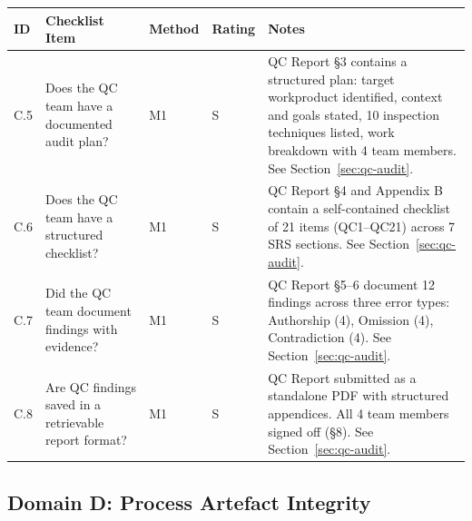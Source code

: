 \documentclass[11pt,a4paper]{article}
\begin{document}
\begin{longtable}{|L{0.8cm}|L{4cm}|L{1.3cm}|L{1.3cm}|L{5.5cm}|}
\hline
{}
\textbf{ID} & \textbf{Checklist Item} & \textbf{Method} & \textbf{Rating} & \textbf{Notes} \\
\hline
\endhead
C.5 & Does the QC team have a documented audit plan? & M1 & S & QC Report \S3 contains a structured plan: target workproduct identified, context and goals stated, 10 inspection techniques listed, work breakdown with 4 team members. See Section~\ref{sec:qc-audit}. \\\hline
C.6 & Does the QC team have a structured checklist? & M1 & S & QC Report \S4 and Appendix B contain a self-contained checklist of 21 items (QC1--QC21) across 7 SRS sections. See Section~\ref{sec:qc-audit}. \\\hline
C.7 & Did the QC team document findings with evidence? & M1 & S & QC Report \S5--6 document 12 findings across three error types: Authorship (4), Omission (4), Contradiction (4). See Section~\ref{sec:qc-audit}. \\\hline
C.8 & Are QC findings saved in a retrievable report format? & M1 & S & QC Report submitted as a standalone PDF with structured appendices. All 4 team members signed off (\S8). See Section~\ref{sec:qc-audit}. \\\hline
\end{longtable}

\subsection{Domain D: Process Artefact Integrity}
\end{document}
